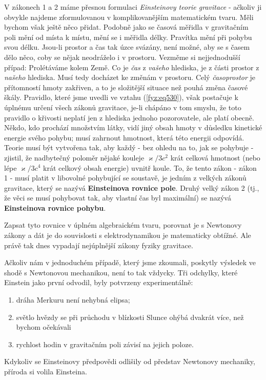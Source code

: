 {    V zákonech \num{1} a \num{2} máme přesnou formulaci \emph{Einsteinovy teorie gravitace} - 
    ačkoliv ji obvykle najdeme zformulovanou v komplikovanějším matematickém tvaru. Měli bychom 
    však ještě něco přidat. Podobně jako se časová měřidla v gravitačním poli mění od místa k 
    místu, mění se i měřidla délky. Pravítka mění při pohybu svou délku. Jsou-li prostor a čas tak 
    úzce svázány, není možné, aby se s časem dělo něco, coby se nějak neodráželo i v prostoru. 
    Vezměme si nejjednodušší případ: Prolétáváme kolem Země. Co je \emph{čas} z \emph{vašeho} 
    hlediska, je z části prostor z \emph{našeho} hlediska. Musí tedy docházet ke změnám v prostoru. 
    Celý \emph{časoprostor} je přítomností hmoty zakřiven, a to je složitější situace než pouhá 
    změna časové škály. Pravidlo, které jsme uvedli ve vztahu (\ref{fyz:eq530}), však postačuje k 
    úplnému určení všech zákonů gravitace, je-li chápáno v tom smyslu, že toto pravidlo o křivosti 
    neplatí jen z hlediska jednoho pozorovatele, ale platí obecně. Někdo, kdo prochází množstvím 
    látky, vidí jiný obsah hmoty v důsledku kinetické energie svého pohybu; musí zahrnout hmotnost, 
    která této energii odpovídá. Teorie musí být vytvořena tak, aby každý - bez ohledu na to, jak 
    se pohybuje - zjistil, že nadbytečný poloměr nějaké kouleje \(\varkappa/3c^2\) krát celková 
    hmotnost (nebo lépe \(\varkappa/3c^4\) krát celkový obsah energie) uvnitř koule. To, že tento 
    zákon - zákon \num{1} - musí platit v libovolné pohybující se soustavě, je jedním z velkých 
    zákonů gravitace, který se nazývá \textbf{Einsteinova rovnice pole}. Druhý velký zákon \num{2} 
    (tj., že věci se musí pohybovat tak, aby vlastní čas byl maximální) se nazývá 
    \textbf{Einsteinova rovnice pohybu}. 
    
    Zapsat tyto rovnice v úplném algebraickém tvaru, porovnat je s Newtonovy zákony a dát je do 
    souvislosti s elektrodynamikou je matematicky obtížné. Ale právě tak dnes vypadají nejúplnější 
    zákony fyziky gravitace. 
    
    Ačkoliv nám v jednoduchém případě, který jsme zkoumali, poskytly výsledek ve shodě s Newtonovou 
    mechanikou, není to tak vždycky. Tři odchylky, které Einstein jako první odvodil, byly 
    potvrzeny experimentálně: 
    \begin{enumerate}
      \item dráha Merkuru není nehybná elipsa;
      \item světlo hvězdy se při průchodu v blízkosti Slunce ohýbá dvakrát více, než bychom 
            očekávali
      \item rychlost hodin v gravitačním poli závisí na jejich poloze.
    \end{enumerate}
    Kdykoliv se Einsteinovy předpovědi odlišily od představ Newtonovy mechaniky, příroda si volila 
    Einsteina. 
    
}
